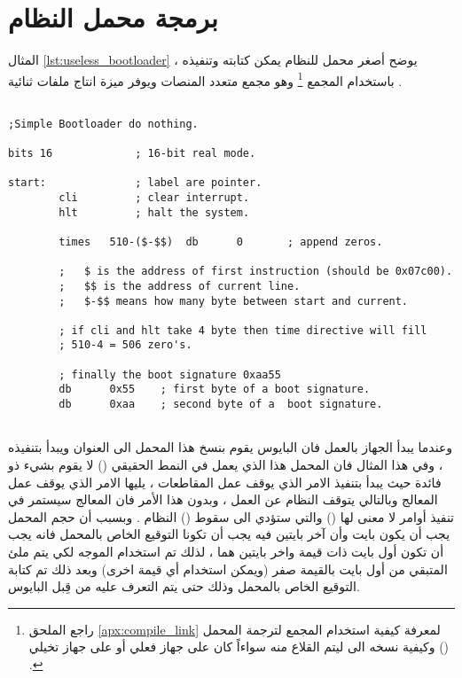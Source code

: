 \documentclass[document.tex]{subfiles}
\begin{document}
\section{برمجة محمل النظام}
المثال \ref{lst:useless_bootloader} يوضح أصغر محمل للنظام يمكن كتابته وتنفيذه ، باستخدام المجمع \footnote{راجع الملحق \ref{apx:compile_link} لمعرفة كيفية استخدام المجمع لترجمة المحمل وكيفية نسخه الى  ليتم القلاع منه سواءاً كان على جهاز فعلي أو على جهاز تخيلي () .} وهو مجمع متعدد المنصات ويوفر ميزة انتاج ملفات ثنائية  .\\

%

\begin{english}


\label{lst:useless_bootloade}
\lstset{numberstyle=\tiny,numbersep=5pt,tabsize=2,extendedchars=true,breaklines=true,frame=b,showspaces=false, showtabs=false,xleftmargin=10pt,framexleftmargin=10pt,framexrightmargin=5pt,framexbottommargin=4pt,showstringspaces=false,language=[x86masm]Assembler}

\begin{lstlisting}[label=lst:useless_bootloader,caption=Smallest Bootloader]

;Simple Bootloader do nothing.

bits 16				; 16-bit real mode.

start:				; label are pointer.
		cli			; clear interrupt.		
		hlt			; halt the system.
		
		times	510-($-$$)	db		0		; append zeros.
		
		; 	$ is the address of first instruction (should be 0x07c00).
		;	$$ is the address of current line.
		; 	$-$$ means how many byte between start and current.
		
		; if cli and hlt take 4 byte then time directive will fill
		; 510-4 = 506 zero's.
		
		; finally the boot signature 0xaa55
		db		0x55	; first byte of a boot signature.
		db		0xaa	; second byte of a  boot signature.
		
\end{lstlisting}
\end{english}

وعندما يبدأ الجهاز بالعمل فان البايوس يقوم بنسخ هذا المحمل الى العنوان  ويبدأ بتنفيذه ، وفي هذا المثال فان المحمل هذا الذي يعمل في النمط الحقيقي () لا يقوم بشيء ذو فائدة حيث يبدأ بتنفيذ الامر  الذي يوقف عمل المقاطعات ، يليها الامر  الذي يوقف عمل المعالج وبالتالي يتوقف النظام عن العمل ، وبدون هذا الأمر فان المعالج سيستمر في تنفيذ أوامر لا معنى لها () والتي ستؤدي الى سقوط () النظام .  
وبسبب أن حجم المحمل يجب أن يكون  بايت وأن آخر بايتين فيه يجب أن تكونا التوقيع الخاص بالمحمل فانه يجب أن تكون أول  بايت ذات قيمة واخر بايتين هما  ، لذلك تم استخدام الموجه  لكي يتم ملئ المتبقي من أول  بايت بالقيمة صفر (ويمكن استخدام أي قيمة اخرى) وبعد ذلك تم كتابة التوقيع الخاص بالمحمل وذلك حتى يتم التعرف عليه من قِبل البايوس.
\end{document}
